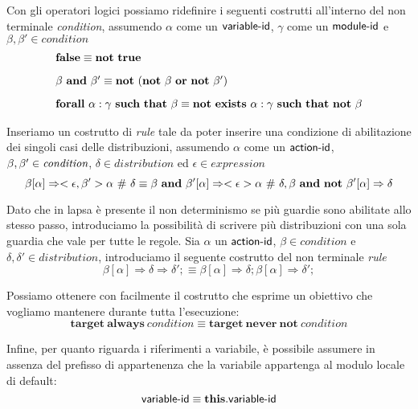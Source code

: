 Con gli operatori logici possiamo ridefinire i seguenti costrutti all'interno del non terminale \emph{condition}, assumendo $\alpha$ come un ${\sf variable}\textrm{-}{\sf id}$, $\gamma$ come un ${\sf module}\textrm{-}{\sf id}$ e $\beta,\beta' \in \mathit{condition}$
$$
\begin{array}{l}
	\mathbf{false} \equiv \mathbf{not} \mbox{ } \mathbf{true}
	\\[.3cm]
	\beta \mbox{ } \mathbf{and} \mbox{ } \beta' \equiv \mathbf{not} \mbox{ } (\mathbf{not} \mbox{ } \beta \mbox{ } \mathbf{or} \mbox{ } \mathbf{not} \mbox{ } \beta')
	\\[.3cm]
	\mathbf{forall} \mbox{ } \alpha:\gamma \mbox{ } \mathbf{such} \mbox{ } \mathbf{that} \mbox{ } \beta \equiv \mathbf{not} \mbox{ } \mathbf{exists} \mbox{ } \alpha:\gamma \mbox{ } \mathbf{such} \mbox{ } \mathbf{that} \mbox{ } \mathbf{not} \mbox{ } \beta
	\\
\end{array}
$$

Inseriamo un costrutto di \emph{rule} tale da poter inserire una condizione di abilitazione dei singoli casi delle distribuzioni, assumendo $\alpha$ come un ${\sf action}\textrm{-}{\sf id}$, $\beta, \beta' \in \emph{condition}$, $\delta \in \mathit{distribution}$ ed $\epsilon \in \mathit{expression}$
$$
\beta [\alpha] \Rightarrow <\epsilon,\beta'> \alpha \mbox{ } \# \mbox{ } \delta
\equiv
\beta \mbox{ } \mathbf{and} \mbox{ } \beta' [\alpha]\Rightarrow <\epsilon> \alpha \mbox{ } \# \mbox{ } \delta,
\beta \mbox{ } \mathbf{and} \mbox{ } \mathbf{not} \mbox{ } \beta' [\alpha]\Rightarrow \delta
$$

Dato che in \ac{lapsa} è presente il non determinismo se più guardie sono abilitate allo stesso passo, introduciamo la possibilità di scrivere più distribuzioni con una sola guardia che vale per tutte le regole. Sia $\alpha$ un ${\sf action}\textrm{-}{\sf id}$, $\beta \in \mathit{condition}$ e $\delta,\delta' \in \mathit{distribution}$, introduciamo il seguente costrutto del non terminale \emph{rule}
$$
\beta [\alpha] \Rightarrow \delta \Rightarrow \delta';
\equiv
\beta [\alpha] \Rightarrow \delta; \beta [\alpha] \Rightarrow \delta'; 
$$

Possiamo ottenere con facilmente il costrutto che esprime un obiettivo che vogliamo mantenere durante tutta l'esecuzione:
$$
	\mathbf{target}\ \mathbf{always}\ \mathit{condition} \equiv \mathbf{target}\ \mathbf{never}\ \mathbf{not}\ \mathit{condition}
$$

Infine, per quanto riguarda i riferimenti a variabile, è possibile assumere in assenza del prefisso di appartenenza che la variabile appartenga al modulo locale di default:
$$
	{\sf variable}\textrm{-}{\sf id} \equiv \mathbf{this}.{\sf variable}\textrm{-}{\sf id}
$$

